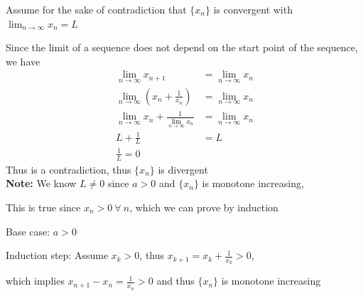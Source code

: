 \documentclass{article}
\begin{document}
Assume for the sake of contradiction that \(\{x_n\}\) is convergent with \(\lim_{n\to\infty}{x_n} = L\)

Since the limit of a sequence does  not depend on the start point of the sequence, we have
\begin{align*}
    \lim_{n\to\infty}{x_{n+1}} &= \lim_{n\to\infty}{x_n}
    \\
    \lim_{n\to\infty}{(x_{n} + \frac{1}{x_n})} &= \lim_{n\to\infty}{x_n}
    \\
    \lim_{n\to\infty}{x_{n}} + \frac{1}{\lim_{n\to\infty}x_n} &= \lim_{n\to\infty}{x_n}
    \\
    L + \frac{1}{L} &= L
    \\
    \frac{1}{L} = 0
\end{align*}
Thus is a contradiction, thus \(\{x_n\}\) is divergent
\\

\textbf{Note:} We know \(L \neq 0\) since \(a>0 \) and \(\{x_n\}\) is monotone increasing, 

This is true since \(x_n > 0  \ \forall \ n\), which we can prove by induction

Base case: \(a>0\)

Induction step: Assume \(x_k >0\), thus \(x_{k+1} = x_k + \frac{1}{x_k} > 0\),

which implies \(x_{n+1} -x_n = \frac{1}{x_n} > 0\) and thus \(\{x_n\}\) is monotone increasing
\end{document}
